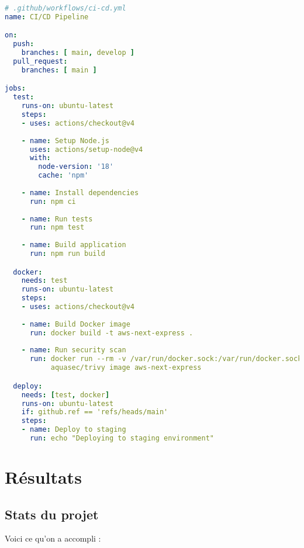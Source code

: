 \documentclass[12pt,a4paper]{report}
\begin{document}
\begin{lstlisting}[language=yaml, caption=Pipeline CI/CD avec GitHub Actions]
# .github/workflows/ci-cd.yml
name: CI/CD Pipeline

on:
  push:
    branches: [ main, develop ]
  pull_request:
    branches: [ main ]

jobs:
  test:
    runs-on: ubuntu-latest
    steps:
    - uses: actions/checkout@v4
    
    - name: Setup Node.js
      uses: actions/setup-node@v4
      with:
        node-version: '18'
        cache: 'npm'
    
    - name: Install dependencies
      run: npm ci
    
    - name: Run tests
      run: npm test
    
    - name: Build application
      run: npm run build

  docker:
    needs: test
    runs-on: ubuntu-latest
    steps:
    - uses: actions/checkout@v4
    
    - name: Build Docker image
      run: docker build -t aws-next-express .
    
    - name: Run security scan
      run: docker run --rm -v /var/run/docker.sock:/var/run/docker.sock 
           aquasec/trivy image aws-next-express

  deploy:
    needs: [test, docker]
    runs-on: ubuntu-latest
    if: github.ref == 'refs/heads/main'
    steps:
    - name: Deploy to staging
      run: echo "Deploying to staging environment"
\end{lstlisting}

\chapter{Résultats}

\section{Stats du projet}

Voici ce qu'on a accompli :
\end{document}
